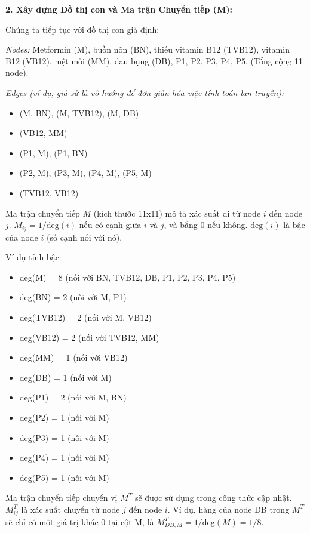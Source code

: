 \documentclass[../main.tex]{subfiles}
\begin{document}
\textbf{2. Xây dựng Đồ thị con và Ma trận Chuyển tiếp (M):}

Chúng ta tiếp tục với đồ thị con giả định:

\textit{Nodes:} Metformin (M), buồn nôn (BN), thiếu vitamin B12 (TVB12), vitamin B12 (VB12), mệt mỏi (MM), đau bụng (DB), P1, P2, P3, P4, P5. (Tổng cộng 11 node).

\textit{Edges (ví dụ, giả sử là vô hướng để đơn giản hóa việc tính toán lan truyền):}
\begin{itemize}
    \item (M, BN), (M, TVB12), (M, DB)
    \item (VB12, MM)
    \item (P1, M), (P1, BN)
    \item (P2, M), (P3, M), (P4, M), (P5, M)
    \item (TVB12, VB12)
\end{itemize}

Ma trận chuyển tiếp \(M\) (kích thước 11x11) mô tả xác suất đi từ node \(i\) đến node \(j\). \(M_{ij} = 1 / \text{deg}(i)\) nếu có cạnh giữa \(i\) và \(j\), và bằng 0 nếu không. \(\text{deg}(i)\) là bậc của node \(i\) (số cạnh nối với nó).

Ví dụ tính bậc:
\begin{itemize}
    \item deg(M) = 8 (nối với BN, TVB12, DB, P1, P2, P3, P4, P5)
    \item deg(BN) = 2 (nối với M, P1)
    \item deg(TVB12) = 2 (nối với M, VB12)
    \item deg(VB12) = 2 (nối với TVB12, MM)
    \item deg(MM) = 1 (nối với VB12)
    \item deg(DB) = 1 (nối với M)
    \item deg(P1) = 2 (nối với M, BN)
    \item deg(P2) = 1 (nối với M)
    \item deg(P3) = 1 (nối với M)
    \item deg(P4) = 1 (nối với M)
    \item deg(P5) = 1 (nối với M)
\end{itemize}

Ma trận chuyển tiếp chuyển vị \(M^T\) sẽ được sử dụng trong công thức cập nhật. \(M^T_{ij}\) là xác suất chuyển từ node \(j\) đến node \(i\). Ví dụ, hàng của node DB trong \(M^T\) sẽ chỉ có một giá trị khác 0 tại cột M, là \(M^T_{DB, M} = 1 / \text{deg}(M) = 1/8\).
\end{document}
